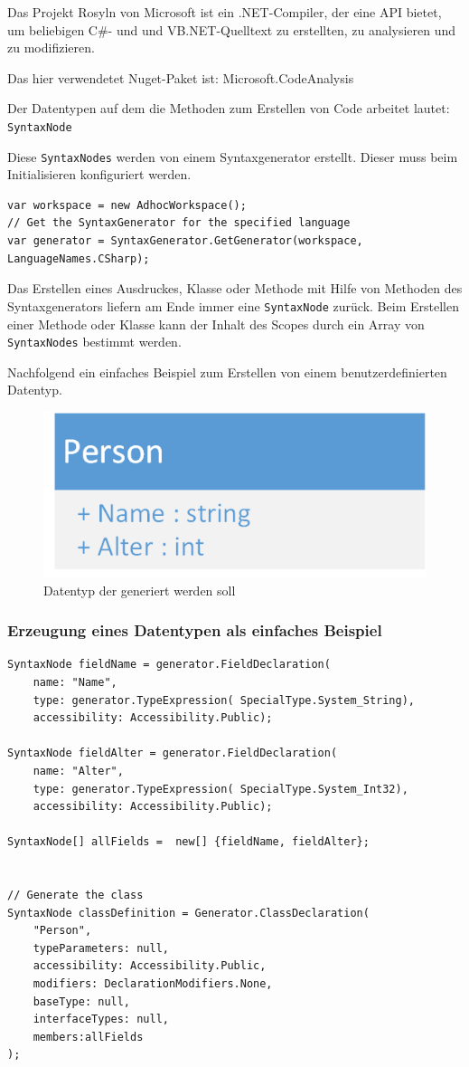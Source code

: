 Das Projekt Rosyln von Microsoft ist ein .NET-Compiler, der eine API bietet, um beliebigen C\#- und und VB.NET-Quelltext zu erstellten,
zu analysieren und zu modifizieren.

Das hier verwendetet Nuget-Paket ist: Microsoft.CodeAnalysis

Der Datentypen auf dem die Methoden zum Erstellen von Code arbeitet lautet:
\texttt{SyntaxNode} 

Diese \texttt{SyntaxNodes} werden von einem Syntaxgenerator erstellt.
Dieser muss beim Initialisieren konfiguriert werden.

\begin{lstlisting}[caption=SyntaxGenerator für C\# erhalten]
var workspace = new AdhocWorkspace();
// Get the SyntaxGenerator for the specified language
var generator = SyntaxGenerator.GetGenerator(workspace, LanguageNames.CSharp);
\end{lstlisting}


Das Erstellen eines Ausdruckes, Klasse oder Methode mit Hilfe von Methoden
des Syntaxgenerators liefern am Ende immer eine \texttt{SyntaxNode} zurück.
Beim Erstellen einer Methode oder Klasse kann der Inhalt des Scopes durch
ein Array von \texttt{SyntaxNodes} bestimmt werden.

Nachfolgend ein einfaches Beispiel zum Erstellen von einem
benutzerdefinierten Datentyp.

\begin{figure}[H]
	\centering
	\includegraphics[width=0.3\linewidth]{./img/Person.png}
	\caption{Datentyp der generiert werden soll}
\end{figure}

	\subsubsection{Erzeugung eines Datentypen als einfaches Beispiel}
	
	\begin{lstlisting}[caption=Erzeugung einer Person-Klasse mit Roslyn]
SyntaxNode fieldName = generator.FieldDeclaration(
	name: "Name",
	type: generator.TypeExpression( SpecialType.System_String),
	accessibility: Accessibility.Public);

SyntaxNode fieldAlter = generator.FieldDeclaration(
	name: "Alter",
	type: generator.TypeExpression( SpecialType.System_Int32),
	accessibility: Accessibility.Public);

SyntaxNode[] allFields =  new[] {fieldName, fieldAlter};


// Generate the class
SyntaxNode classDefinition = Generator.ClassDeclaration(
	"Person", 
	typeParameters: null,
	accessibility: Accessibility.Public,
	modifiers: DeclarationModifiers.None,
	baseType: null,
	interfaceTypes: null,
	members:allFields
);
	\end{lstlisting}
	
